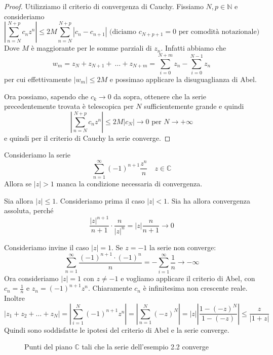 \begin{proof}
    Utilizziamo il criterio di convergenza di Cauchy. Fissiamo \(N, p \in
    \mathbb{N}\) e consideriamo
    \[
        \left| \sum_{n=N}^{N+p} c_{n} z^{n} \right| \le 2M\sum_{n=N}^{N+p} |c_{n}
        - c_{n+1}| \text{ (diciamo \(c_{N+p+1} = 0 \) per comodità notazionale) }
    \]
    Dove \(M\) è maggiorante per le somme parziali di \(z_{n}\). Infatti abbiamo
    che 
    \[
        w_m = z_N + z_{N+1} +~\dots + z_{N+m} = \sum_{i=0}^{N+m} z_{n} -
        \sum_{i=0}^{N-1} z_{n}
    \]
    per cui effettivamente \(|w_m| \le 2M\) e possimao applicare la
    disuguaglianza di Abel.
    
    Ora possiamo, sapendo che \(c_k \to 0\) da sopra, ottenere che la serie
    precedentemente trovata è telescopica per \(N\) sufficientemente grande e
    quindi
    \[
        \left| \sum_{n=N}^{N+p} c_{n} z^{n} \right| \le 2M|c_{N}|\to 0 \text{ per
        } N \to +\infty
    \]
    e quindi per il criterio di Cauchy la serie converge.
\end{proof}
\begin{example}
    Consideriamo la serie
    \[
    \sum_{n=1}^{\infty} {(-1)}^{n+1} \frac{z^{n}}{n} \quad z \in \mathbb{C}
    \]
    Allora se \(|z| > 1\) manca la condizione necessaria di convergenza.

    Sia allora \(|z| \le  1\). Consideriamo prima il caso \(|z| < 1\). Sia ha
    allora convergenza assoluta, perché
    \[
        \frac{|z|^{n+1}}{n+1} \cdot \frac{n}{|z|^{n}} =  |z| \frac{n}{n+1} \to 0
    \]

    Consideriamo invine il caso \(|z| = 1\). Se \(z = -1\) la serie non
    converge:
    \[
        \sum_{n=1}^{\infty} \frac{{(-1)}^{n+1} \cdot {(-1)}^{n}}{n} = -
        \sum_{i=1}^{\infty} \frac{1}{n}  \to -\infty
    \]
    Ora consideriamo \(|z|=1\) con \(z\neq-1\) e vogliamo applicare il criterio
    di Abel, con \(c_{n} = \frac{1}{n}\) e \(z_{n} = {(-1)}^{n+1} z^{n}\).
    Chiaramente \(c_{n}\) è infinitesima non crescente reale. Inoltre
    \[
        |z_{1} + z_{2} + \dots + z_N| = \left| \sum_{i=1}^{N} {(-1)}^{n+1} z^{n}
        \right| = \left| \sum_{n=1}^{N} (-z)^{N} \right| = |z| \left| \frac{1 -
        {(-z)}^{N}}{1 - (-z)} \right| \le \frac{z}{|1+z|}
    \]
    Quindi sono soddisfatte le ipotesi del criterio di Abel e la serie converge.

\begin{figure}[ht]
    \centering
    \caption{Punti del piano \(\mathbb{C}\) tali che la serie dell'esempio 2.2
    converge}\label{fig:esempio2}
\end{figure}
\end{example}
